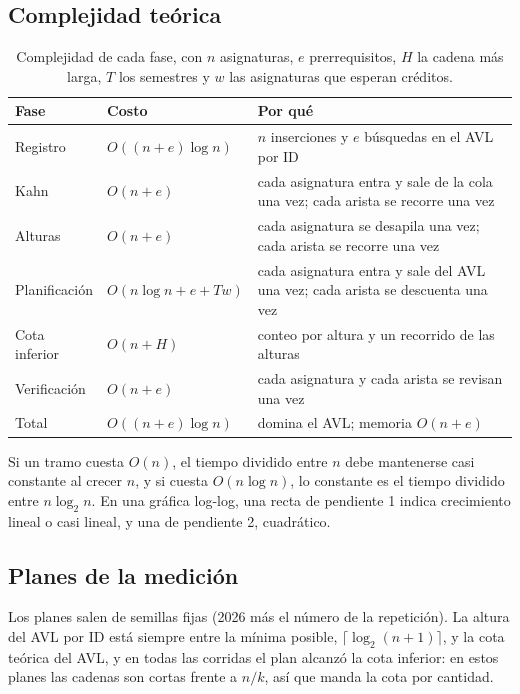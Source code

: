 \documentclass[11pt,letterpaper]{article}
\begin{document}
\subsection{Complejidad teórica}

\begin{table}[H]
\centering
\small
\caption{Complejidad de cada fase, con $n$ asignaturas, $e$ prerrequisitos, $H$ la cadena más larga, $T$ los semestres y $w$ las asignaturas que esperan créditos.}
\label{tab:complejidad}
\begin{tabularx}{\linewidth}{@{}l l L@{}}
\toprule
\textbf{Fase} & \textbf{Costo} & \textbf{Por qué} \\
\midrule
Registro & $O((n + e) \log n)$ & $n$ inserciones y $e$ búsquedas en el AVL por ID \\
Kahn & $O(n + e)$ & cada asignatura entra y sale de la cola una vez; cada arista se recorre una vez \\
Alturas & $O(n + e)$ & cada asignatura se desapila una vez; cada arista se recorre una vez \\
Planificación & $O(n \log n + e + T w)$ & cada asignatura entra y sale del AVL una vez; cada arista se descuenta una vez \\
Cota inferior & $O(n + H)$ & conteo por altura y un recorrido de las alturas \\
Verificación & $O(n + e)$ & cada asignatura y cada arista se revisan una vez \\
\midrule
Total & $O((n + e) \log n)$ & domina el AVL; memoria $O(n + e)$ \\
\bottomrule
\end{tabularx}
\end{table}

Si un tramo cuesta $O(n)$, el tiempo dividido entre $n$ debe mantenerse casi constante al crecer $n$, y si cuesta $O(n \log n)$, lo constante es el tiempo dividido entre $n \log_2 n$. En una gráfica log-log, una recta de pendiente 1 indica crecimiento lineal o casi lineal, y una de pendiente 2, cuadrático.

\subsection{Planes de la medición}
Los planes salen de semillas fijas (2026 más el número de la repetición). La altura del AVL por ID está siempre entre la mínima posible, $\lceil \log_2(n + 1) \rceil$, y la cota teórica del AVL, y en todas las corridas el plan alcanzó la cota inferior: en estos planes las cadenas son cortas frente a $n/k$, así que manda la cota por cantidad.
\end{document}

